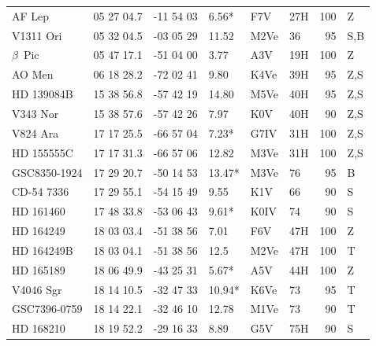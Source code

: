 \documentclass[11pt,twoside]{book}
\begin{document}
\begin{table}[]
{\begin{tabular}{lcclllrl}
AF Lep      &05 27 04.7     &-11 54 03      &\hspace{2mm}6.56* &F7V   &27H &100&Z\\
V1311 Ori   &05 32 04.5     &-03 05 29      &11.52   &M2Ve&  36 &   95  &S,B\\
$\beta$~Pic &05 47 17.1	    &-51 04 00	    &\hspace{2mm}3.77  &A3V   &19H &100&Z\\
AO Men      &06 18 28.2	    &-72 02 41	    &\hspace{2mm}9.80  &K4Ve  &39H &95&Z,S\\
HD 139084B  &15 38 56.8	    &-57 42 19	    &14.80   &M5Ve  &40H     &95&Z,S\\
V343 Nor    &15 38 57.6	    &-57 42 26	    &\hspace{2mm}7.97  &K0V   &40H&90&Z,S\\
V824 Ara    &17 17 25.5	    &-66 57 04	    &\hspace{2mm}7.23* &G7IV  &31H &100&Z,S\\
HD 155555C  &17 17 31.3	    &-66 57 06	    &12.82   &M3Ve  &31H     &100&Z,S\\
GSC8350-1924&17 29 20.7     &-50 14 53      &13.47*  &M3Ve  &76       &95&B\\
CD-54 7336  &17 29 55.1	    &-54 15 49	    &\hspace{2mm}9.55  &K1V   &66 &90&S\\
HD 161460   &17 48 33.8	    &-53 06 43	    &\hspace{2mm}9.61* &K0IV   &74&90&S\\
HD 164249   &18 03 03.4     &-51 38 56      &\hspace{2mm}7.01  &F6V   &47H&100&Z\\
HD 164249B  &18 03 04.1     &-51 38 56      &12.5    &M2Ve  &    47H&100&T\\
HD 165189   &18 06 49.9     &-43 25 31      &\hspace{2mm}5.67* &A5V    &44H&100&Z\\
V4046 Sgr   &18 14 10.5	    &-32 47 33	    &10.94*  &K6Ve  &73             &95&T\\
GSC7396-0759&18 14 22.1	    &-32 46 10	    &12.78   &M1Ve  &73&          90&T\\
HD 168210   &18 19 52.2	    &-29 16 33	    &\hspace{2mm}8.89  &G5V   &75H &90&S\\

\end{tabular}}
\end{table}
\end{document}
